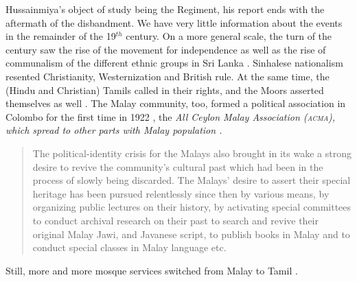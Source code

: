 Hussainmiya's object of study being the Regiment, his report ends with the aftermath of the disbandment. We have very little information about the events in the remainder of the 19$^{th}$ century. On a more general scale, the turn of the century saw the rise of the movement for independence as well as the rise of communalism of the different ethnic groups in Sri Lanka \citep{Desilva1981,Hellmann1990,NissanEtAl1990}. Sinhalese nationalism resented Christianity, Westernization and British rule. At the same time, the (Hindu and Christian) Tamils called in their rights, and  the Moors asserted themselves as well \citep[12]{Nuhman2007}. The Malay community, too, formed a political association in Colombo for the first time in 1922 \citep[19]{Saldin2001}, the \em  All Ceylon Malay Association \em (\textsc{acma}), which spread to other parts with Malay population \citep[21]{Hussainmiya1987}.

\begin{quote}
The political-identity crisis for the Malays also brought in its wake a strong desire to revive the community's cultural past which had been in the process of slowly being discarded. \el{}  The Malays' desire to assert their special heritage has been pursued relentlessly since then by various means, by organizing public lectures on their history, by activating special committees to conduct archival research on their past to search and revive their original Malay Jawi, and Javanese script, to publish books in Malay and to conduct special classes in Malay language etc.
\citep[16--18]{Hussainmiya1987}
\end{quote}

Still, more and more mosque services switched from Malay to Tamil \citep[23]{Bichsel}.

